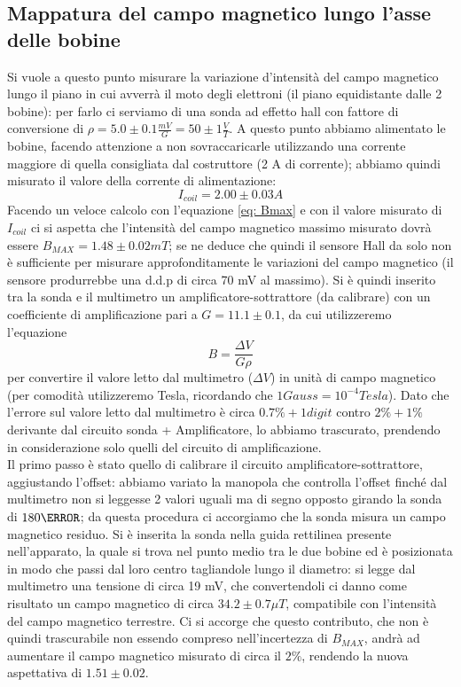 \documentclass[10pt, a4paper, italian]{article}
\begin{document}
\subsection{Mappatura del campo magnetico lungo l'asse delle bobine}
\label{sec:map}
Si vuole a questo punto misurare la variazione d'intensità del campo magnetico lungo il piano in cui avverrà il moto degli elettroni (il piano equidistante dalle 2 bobine): per farlo ci serviamo di una sonda ad effetto hall con fattore di conversione di $\rho=5.0 \pm 0.1 \frac{mV}{G} = 50 \pm 1 \frac{V}{T}$.
A questo punto abbiamo alimentato le bobine, facendo attenzione a non sovraccaricarle utilizzando una corrente maggiore di quella consigliata dal costruttore (2 A di corrente); abbiamo quindi misurato il valore della corrente di alimentazione:
\[
I_{coil}=2.00 \pm 0.03 A
\]
Facendo un veloce calcolo con l'equazione \cref{eq: Bmax} e con il valore misurato di $I_{coil}$ ci si aspetta che l'intensità del campo magnetico massimo misurato dovrà essere $B_{MAX} = 1.48 \pm 0.02 \si{mT}$; se ne deduce che quindi il sensore Hall da solo non è sufficiente per misurare approfonditamente le variazioni del campo magnetico (il sensore produrrebbe una d.d.p di circa 70 mV al massimo).
Si è quindi inserito tra la sonda e il multimetro un amplificatore-sottrattore (da calibrare) con un coefficiente di amplificazione pari a $G=11.1 \pm 0.1$, da cui utilizzeremo l'equazione
\begin{equation}
B=\frac{\Delta V}{G \rho}
\end{equation}
per convertire il valore letto dal multimetro ($\Delta V$) in unità di campo magnetico (per comodità utilizzeremo Tesla, ricordando che $1 Gauss = 10^{-4} Tesla$).
Dato che l'errore sul valore letto dal multimetro è circa $0.7 \percent + 1 digit$ contro $2 \percent + 1 \percent$ derivante dal circuito sonda + Amplificatore, lo abbiamo trascurato, prendendo in considerazione solo quelli del circuito di amplificazione.\\
Il primo passo è stato quello di calibrare il circuito amplificatore-sottrattore, aggiustando l'offset: abbiamo variato la manopola che controlla l'offset finché dal multimetro non si leggesse 2 valori uguali ma di segno opposto girando la sonda di $180 \degree$; da questa procedura ci accorgiamo che la sonda misura un campo magnetico residuo.
Si è inserita la sonda nella guida rettilinea presente nell'apparato, la quale si trova nel punto medio tra le due bobine ed è posizionata in modo che passi dal loro centro tagliandole lungo il diametro: si legge dal multimetro una tensione di circa 19 mV, che convertendoli ci danno come risultato un campo magnetico di circa $34.2 \pm 0.7 \mu T$, compatibile con l'intensità del campo magnetico terrestre. Ci si accorge che questo contributo, che non è quindi trascurabile non essendo compreso nell'incertezza di $B_{MAX}$, andrà ad aumentare il campo magnetico misurato di circa il $2 \percent$, rendendo la nuova aspettativa di $1.51 \pm 0.02$.\\
\end{document}
